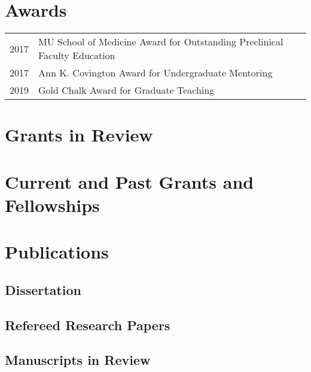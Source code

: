 \documentclass[10pt,letterpaper,]{article}
\begin{document}
\hypertarget{awards}{%
\section{Awards}\label{awards}}

\begin{tabular}{rl}
  2017 & MU School of Medicine Award for Outstanding Preclinical Faculty Education \\ 
  2017 & Ann K. Covington Award for Undergraduate Mentoring \\ 
  2019 & Gold Chalk Award for Graduate Teaching \\ 
  \end{tabular}

\hypertarget{grants-in-review}{%
\section{Grants in Review}\label{grants-in-review}}


\hypertarget{current-and-past-grants-and-fellowships}{%
\section{Current and Past Grants and
Fellowships}\label{current-and-past-grants-and-fellowships}}


\hypertarget{publications}{%
\section{Publications}\label{publications}}

\hypertarget{dissertation}{%
\subsection{Dissertation}\label{dissertation}}

\hypertarget{refereed-research-papers}{%
\subsection{Refereed Research Papers}\label{refereed-research-papers}}

\hypertarget{manuscripts-in-review}{%
\subsection{Manuscripts in Review}\label{manuscripts-in-review}}
\end{document}
